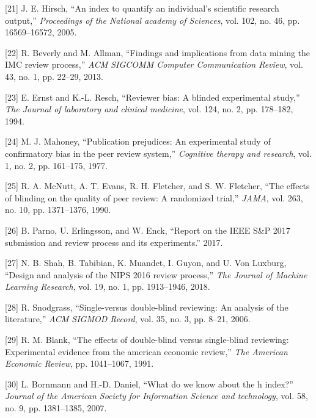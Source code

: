 \documentclass[12pt]{article}
\begin{document}
\leavevmode\hypertarget{ref-hirsch05:index}{}%
{[}21{]} J. E. Hirsch, ``An index to quantify an individual's scientific research output,'' \emph{Proceedings of the National academy of Sciences}, vol. 102, no. 46, pp. 16569--16572, 2005.

\leavevmode\hypertarget{ref-beverly13:findings}{}%
{[}22{]} R. Beverly and M. Allman, ``Findings and implications from data mining the IMC review process,'' \emph{ACM SIGCOMM Computer Communication Review}, vol. 43, no. 1, pp. 22--29, 2013.

\leavevmode\hypertarget{ref-ernst94:reviewer}{}%
{[}23{]} E. Ernst and K.-L. Resch, ``Reviewer bias: A blinded experimental study,'' \emph{The Journal of laboratory and clinical medicine}, vol. 124, no. 2, pp. 178--182, 1994.

\leavevmode\hypertarget{ref-mahoney77:publication}{}%
{[}24{]} M. J. Mahoney, ``Publication prejudices: An experimental study of confirmatory bias in the peer review system,'' \emph{Cognitive therapy and research}, vol. 1, no. 2, pp. 161--175, 1977.

\leavevmode\hypertarget{ref-mcnutt90:blinding}{}%
{[}25{]} R. A. McNutt, A. T. Evans, R. H. Fletcher, and S. W. Fletcher, ``The effects of blinding on the quality of peer review: A randomized trial,'' \emph{JAMA}, vol. 263, no. 10, pp. 1371--1376, 1990.

\leavevmode\hypertarget{ref-parno17:SPsurvey}{}%
{[}26{]} B. Parno, U. Erlingsson, and W. Enck, ``Report on the IEEE S\&P 2017 submission and review process and its experiments.'' 2017.

\leavevmode\hypertarget{ref-shah18:design}{}%
{[}27{]} N. B. Shah, B. Tabibian, K. Muandet, I. Guyon, and U. Von Luxburg, ``Design and analysis of the NIPS 2016 review process,'' \emph{The Journal of Machine Learning Research}, vol. 19, no. 1, pp. 1913--1946, 2018.

\leavevmode\hypertarget{ref-snodgrass06:single}{}%
{[}28{]} R. Snodgrass, ``Single-versus double-blind reviewing: An analysis of the literature,'' \emph{ACM SIGMOD Record}, vol. 35, no. 3, pp. 8--21, 2006.

\leavevmode\hypertarget{ref-blank91:effects}{}%
{[}29{]} R. M. Blank, ``The effects of double-blind versus single-blind reviewing: Experimental evidence from the american economic review,'' \emph{The American Economic Review}, pp. 1041--1067, 1991.

\leavevmode\hypertarget{ref-bornmann07:hindex}{}%
{[}30{]} L. Bornmann and H.-D. Daniel, ``What do we know about the h index?'' \emph{Journal of the American Society for Information Science and technology}, vol. 58, no. 9, pp. 1381--1385, 2007.
\end{document}
